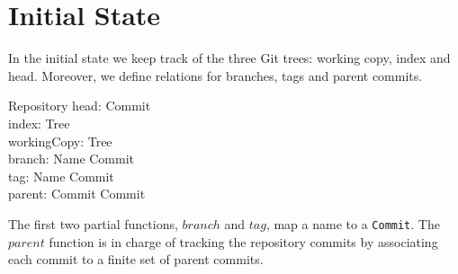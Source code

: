 \section{Initial State}

In the initial state we keep track of the three Git trees: working copy, index
and head.  Moreover, we define relations for branches, tags and parent commits.

\begin{schema}{Repository}
	head: Commit \\
	index: Tree \\
	workingCopy: Tree \\
	branch: Name \pfun Commit \\
	tag: Name \pfun Commit \\
	parent: Commit \pfun \finset Commit
\end{schema}

The first two partial functions, $branch$ and $tag$, map a name to a
\texttt{Commit}.  The $parent$ function is in charge of tracking the repository
commits by associating each commit to a finite set of parent commits.

